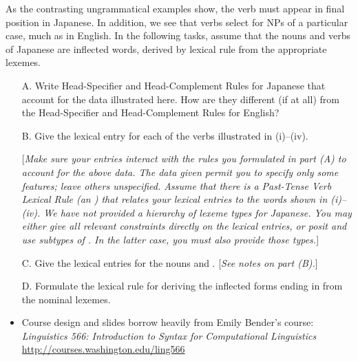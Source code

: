 \documentclass[a4paper,landscape,headrule,footrule]{foils}
\begin{document}
									
\noindent
As the contrasting ungrammatical examples show, the verb must appear
in final position in  Japanese. In addition, we see
that  verbs select for NPs of a particular
 case, much as in English. In the following tasks, assume
that the nouns and verbs of Japanese are  inflected words, derived by lexical rule from the appropriate
lexemes.

\begin{itemize}\addtolength{\itemsep}{1ex}

\item[A.] Write Head-Specifier and 
Head-Complement Rules for
Japanese that account for the data illustrated here.  How are
they different (if at all) from the Head-Specifier and Head-Complement 
Rules for English?

\item[B.] Give the lexical entry for each of the verbs
illustrated in (i)--(iv). 

[{\sl Make sure your entries interact with the rules you
formulated in part (A) to account for the above data.  The data given
permit you to specify only some features; leave others unspecified.
Assume that there is a Past-Tense Verb Lexical Rule (an )
that relates your lexical entries to the words shown in (i)--(iv).  We
have not provided a hierarchy of lexeme types for Japanese.  You may
either give all relevant constraints directly on the lexical entries,
or posit and use subtypes of .  In the latter case, you
must also provide those types.}]
\newpage

\item[C.] Give the lexical entries for the nouns  and
. [{\sl See notes on part (B).}]

\item[D.] Formulate the lexical rule for deriving the inflected
forms ending in  from
the nominal lexemes.


\end{itemize}



\begin{itemize}
\item Course design and slides borrow heavily from Emily Bender's course:
\textit{Linguistics 566: Introduction to Syntax for Computational Linguistics}
\\ \url{http://courses.washington.edu/ling566}
\end{itemize}


%
\end{document}
